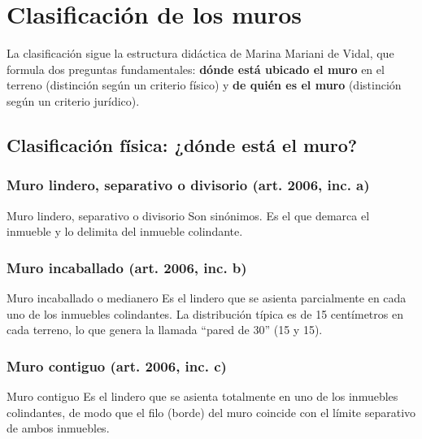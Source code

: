 \documentclass[12pt,oneside]{book}
\begin{document}
\chapter{Clasificación de los muros}

La clasificación sigue la estructura didáctica de Marina Mariani de Vidal, que formula dos preguntas fundamentales: \textbf{dónde está ubicado el muro} en el terreno (distinción según un criterio físico) y \textbf{de quién es el muro} (distinción según un criterio jurídico).

\section{Clasificación física: ¿dónde está el muro?}


\subsection{Muro lindero, separativo o divisorio (art. 2006, inc. a)}

\begin{definition}{Muro lindero, separativo o divisorio}
Son sinónimos. Es el que demarca el inmueble y lo delimita del inmueble colindante.
\end{definition}

\subsection{Muro incaballado (art. 2006, inc. b)}

\begin{definition}{Muro incaballado o medianero}
Es el lindero que se asienta parcialmente en cada uno de los inmuebles colindantes. La distribución típica es de 15 centímetros en cada terreno, lo que genera la llamada ``pared de 30'' (15 y 15).
\end{definition}

\subsection{Muro contiguo (art. 2006, inc. c)}

\begin{definition}{Muro contiguo}
Es el lindero que se asienta totalmente en uno de los inmuebles colindantes, de modo que el filo (borde) del muro coincide con el límite separativo de ambos inmuebles.
\end{definition}
\end{document}
